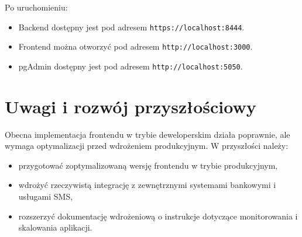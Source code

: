 Po uruchomieniu:
\begin{itemize}
    \item Backend dostępny jest pod adresem \texttt{https://localhost:8444}.
    \item Frontend można otworzyć pod adresem \texttt{http://localhost:3000}.
    \item pgAdmin dostępny jest pod adresem \texttt{http://localhost:5050}.
\end{itemize}

\section{Uwagi i rozwój przyszłościowy}
Obecna implementacja frontendu w trybie deweloperskim działa poprawnie, ale wymaga optymalizacji przed wdrożeniem produkcyjnym. W przyszłości należy:
\begin{itemize}
    \item przygotować zoptymalizowaną wersję frontendu w trybie produkcyjnym,
    \item wdrożyć rzeczywistą integrację z zewnętrznymi systemami bankowymi i usługami SMS,
    \item rozszerzyć dokumentację wdrożeniową o instrukcje dotyczące monitorowania i skalowania aplikacji.
\end{itemize}
